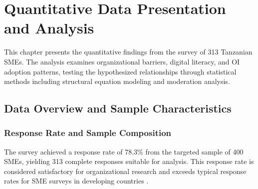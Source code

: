 \chapter{Quantitative Data Presentation and Analysis}

This chapter presents the quantitative findings from the survey of 313 Tanzanian SMEs. The analysis examines organizational barriers, digital literacy, and OI adoption patterns, testing the hypothesized relationships through statistical methods including structural equation modeling and moderation analysis.

\section{Data Overview and Sample Characteristics}

\subsection{Response Rate and Sample Composition}

The survey achieved a response rate of 78.3\% from the targeted sample of 400 SMEs, yielding 313 complete responses suitable for analysis. This response rate is considered satisfactory for organizational research and exceeds typical response rates for SME surveys in developing countries \citep{baruch1999response}.

